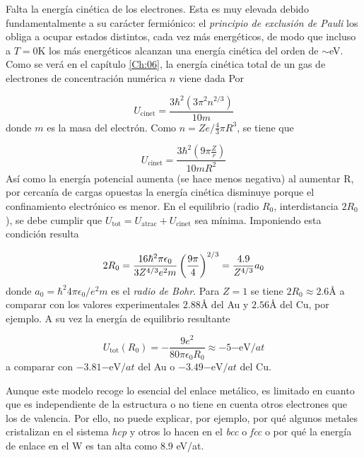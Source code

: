 Falta la energía cinética de los electrones. Esta es muy elevada debido fundamentalmente a su carácter fermiónico: el \textit{principio de exclusión de Pauli} los obliga a ocupar estados distintos, cada vez más energéticos, de modo que incluso a $T=0$K los más energéticos alcanzan una energía cinética del orden de $\sim$eV. Como se verá en el capítulo \ref{Ch:06}, la energía cinética total de un gas de electrones de concentración numérica $n$ viene dada Por

\begin{equation}
    U_{\text{cinet}} = \frac{3\hbar^2 (3 \pi^2 n^{2/3})}{10m}
\end{equation}
donde $m$ es la masa del electrón. Como $n=Ze/\frac{4}{3}\pi R^3$, se tiene que 

\begin{equation}
    U_{\text{cinet}} = \frac{3\hbar^2 (9 \pi \frac{Z}{r})}{10mR^2}
\end{equation}
Así como la energía potencial aumenta (se hace menos negativa) al aumentar R, por cercanía de cargas opuestas la energía cinética disminuye porque el confinamiento electrónico es menor. En el equilibrio (radio $R_0$, interdistancia $2R_0$), se debe cumplir que $U_{\text{tot}}=U_{\text{atrac}}+U_{\text{cinet}}$ sea mínima. Imponiendo esta condición resulta 

\begin{equation}
    2R_0 = \frac{16\hbar^2 \pi \epsilon_0}{3Z^{4/3} e^2 m}\left( \frac{9\pi}{4} \right)^{2/3} = \frac{4.9}{Z^{4/3}} a_0
\end{equation}
donde $a_0 = \hbar^2 4 \pi \epsilon_0 / e^2 m$ es el \textit{radio de Bohr}. Para $Z=1$ se tiene $2R_0 \approx 2.6 \unit{\angstrom}$ a comparar con los valores experimentales $2.88 \unit{\angstrom}$ del Au y $2.56 \unit{\angstrom}$ del Cu, por ejemplo. A su vez la energía de equilibrio resultante

\begin{equation}    
    U_{\text{tot}} (R_0) = - \frac{9e^2}{80 \pi \epsilon_0 R_0} \approx -5\unit{-\eV / at}
\end{equation}
a comparar con $-3.81 \unit{-\eV / at}$ del Au o $-3.49\unit{-\eV / at}$ del Cu. 

Aunque este modelo recoge lo esencial del enlace metálico, es limitado en cuanto que es independiente de la estructura o no tiene en cuenta otros electrones que los de valencia. Por ello, no puede explicar, por ejemplo, por qué algunos metales cristalizan en el sistema \textit{hcp} y otros lo hacen en el \textit{bcc} o \textit{fcc} o por qué la energía de enlace en el W es tan alta como 8.9 \unit{\eV / at}.

